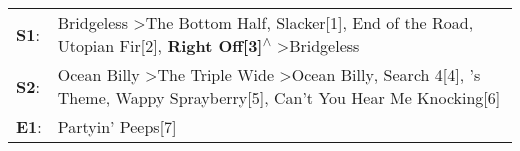 \begin{supertabular}{p{0.03\textwidth}p{0.92\textwidth}}
 \textbf{S1}:  &     Bridgeless\textsuperscript{} \textgreater \enspace The Bottom Half\textsuperscript{}, \enspace Slacker[1]\textsuperscript{}, \enspace End of the Road\textsuperscript{}, \enspace Utopian Fir[2]\textsuperscript{}, \enspace \textbf{Right Off[3]\textsuperscript{$\wedge$}} \textgreater \enspace Bridgeless\textsuperscript{}  \enspace  \\
 \textbf{S2}:  &  Ocean Billy\textsuperscript{} \textgreater \enspace The Triple Wide\textsuperscript{} \textgreater \enspace Ocean Billy\textsuperscript{}, \enspace Search 4[4]\textsuperscript{}, 's Theme\textsuperscript{}, \enspace Wappy Sprayberry[5]\textsuperscript{}, \enspace Can't You Hear Me Knocking[6]\textsuperscript{}  \enspace  \\
 \textbf{E1}:  &                                                                                                                                                                                                                                                                                                 Partyin' Peeps[7]\textsuperscript{}  \enspace  \\
\end{supertabular}
